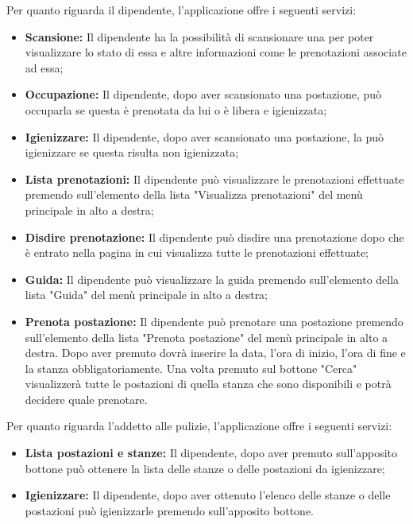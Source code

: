 Per quanto riguarda il dipendente, l'applicazione offre i seguenti servizi:
\begin{itemize}
	\item \textbf{Scansione:} Il dipendente ha la possibilità di scansionare una  per poter visualizzare lo stato di essa e altre informazioni come le prenotazioni associate ad essa; \\
	\item \textbf{Occupazione:} Il dipendente, dopo aver scansionato una postazione, può occuparla se questa è prenotata da lui o è libera e igienizzata; \\
	\item \textbf{Igienizzare:} Il dipendente, dopo aver scansionato una postazione, la può igienizzare se questa risulta non igienizzata; \\
	\item \textbf{Lista prenotazioni:} Il dipendente può visualizzare le prenotazioni effettuate premendo sull'elemento della lista "Visualizza prenotazioni" del menù principale in alto a destra; \\
	\item \textbf{Disdire prenotazione:} Il dipendente può disdire una prenotazione dopo che è entrato nella pagina in cui visualizza tutte le prenotazioni effettuate; \\
	\item \textbf{Guida:} Il dipendente può visualizzare la guida premendo sull'elemento della lista "Guida" del menù principale in alto a destra; \\
	\item \textbf{Prenota postazione:} Il dipendente può prenotare una postazione premendo sull'elemento della lista "Prenota postazione" del menù principale in alto a destra.
	Dopo aver premuto dovrà inserire la data, l'ora di inizio, l'ora di fine e la stanza obbligatoriamente.
	Una volta premuto sul bottone "Cerca" visualizzerà tutte le postazioni di quella stanza che sono disponibili e potrà decidere quale prenotare. \\	
\end{itemize}
Per quanto riguarda l'addetto alle pulizie, l'applicazione offre i seguenti servizi:
\begin{itemize}
\item \textbf{Lista postazioni e stanze:} Il dipendente, dopo aver premuto sull'apposito bottone può ottenere la lista delle stanze o delle postazioni da igienizzare; \\
\item \textbf{Igienizzare:} Il dipendente, dopo aver ottenuto l'elenco delle stanze o delle postazioni può igienizzarle premendo sull'apposito bottone.\\
\end{itemize}




